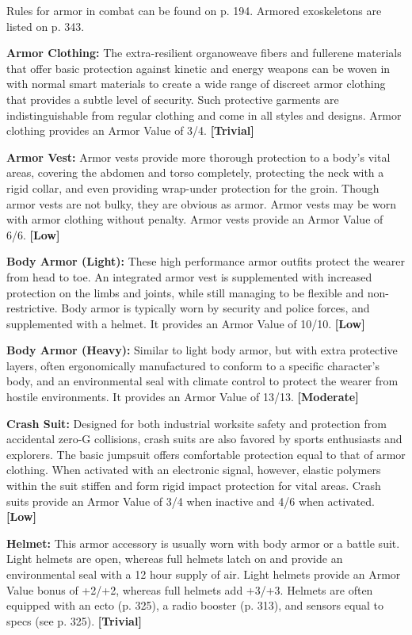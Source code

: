 Rules for armor in combat can be found on p. 194. Armored exoskeletons are listed on p. 343. 

\textbf{Armor Clothing:} The extra-resilient organoweave fibers and fullerene materials that offer basic protection against kinetic and energy weapons can be woven in with normal smart materials to create a wide range of discreet armor clothing that provides a subtle level of security. Such protective garments are indistinguishable from regular clothing and come in all styles and designs. Armor clothing provides an Armor Value of 3/4. \textbf{[Trivial]} 

\textbf{Armor Vest:} Armor vests provide more thorough protection to a body’s vital areas, covering the abdomen and torso completely, protecting the neck with a rigid collar, and even providing wrap-under protection for the groin. Though armor vests are not bulky, they are obvious as armor. Armor vests may be worn with armor clothing without penalty. Armor vests provide an Armor Value of 6/6. \textbf{[Low]} 

\textbf{Body Armor (Light):} These high performance armor outfits protect the wearer from head to toe. An integrated armor vest is supplemented with increased protection on the limbs and joints, while still managing to be flexible and non-restrictive. Body armor is typically worn by security and police forces, and supplemented with a helmet. It provides an Armor Value of 10/10. \textbf{[Low]} 

\textbf{Body Armor (Heavy):} Similar to light body armor, but with extra protective layers, often ergonomically manufactured to conform to a specific character’s body, and an environmental seal with climate control to protect the wearer from hostile environments. It provides an Armor Value of 13/13. \textbf{[Moderate]} 

\textbf{Crash Suit:} Designed for both industrial worksite safety and protection from accidental zero-G collisions, crash suits are also favored by sports enthusiasts and explorers. The basic jumpsuit offers comfortable protection equal to that of armor clothing. When activated with an electronic signal, however, elastic polymers within the suit stiffen and form rigid impact protection for vital areas. Crash suits provide an Armor Value of 3/4 when inactive and 4/6 when activated. \textbf{[Low]} 

\textbf{Helmet:} This armor accessory is usually worn with body armor or a battle suit. Light helmets are open, whereas full helmets latch on and provide an environmental seal with a 12 hour supply of air. Light helmets provide an Armor Value bonus of +2/+2, whereas full helmets add +3/+3. Helmets are often equipped with an ecto (p. 325), a radio booster (p. 313), and sensors equal to specs (see p. 325). \textbf{[Trivial]} 

